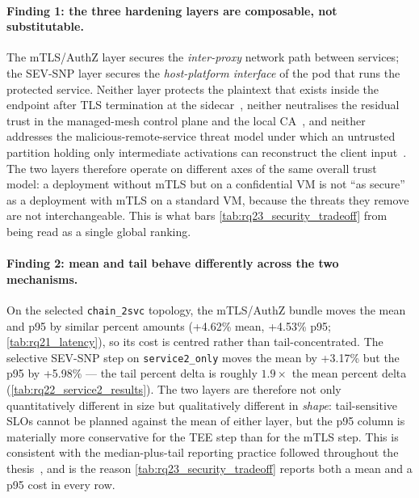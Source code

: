 \paragraph{Finding 1: the three hardening layers are composable, not
substitutable.}
The mTLS/AuthZ layer secures the \emph{inter-proxy} network path between
services; the SEV-SNP layer secures the \emph{host-platform interface} of
the pod that runs the protected service. Neither layer protects the
plaintext that exists inside the endpoint after TLS termination at the
sidecar~\cite{meshinsight_socc23}, neither neutralises the residual trust
in the managed-mesh control plane and the local
CA~\cite{poudel2025mazu}, and neither addresses the malicious-remote-service
threat model under which an untrusted partition holding only intermediate
activations can reconstruct the client
input~\cite{he2021_attacking_collaborative}. The two layers therefore
operate on different axes of the same overall trust model: a deployment
without mTLS but on a confidential VM is not ``as secure'' as a deployment
with mTLS on a standard VM, because the threats they remove are not
interchangeable. This is what bars \cref{tab:rq23_security_tradeoff} from
being read as a single global ranking.

\paragraph{Finding 2: mean and tail behave differently across the two
mechanisms.}
On the selected \texttt{chain\_2svc} topology, the mTLS/AuthZ bundle moves
the mean and p95 by similar percent amounts (+4.62\% mean, +4.53\% p95;
\cref{tab:rq21_latency}), so its cost is centred rather than
tail-concentrated. The selective SEV-SNP step on \texttt{service2\_only}
moves the mean by +3.17\% but the p95 by +5.98\% --- the tail percent
delta is roughly $1.9 \times$ the mean percent delta
(\cref{tab:rq22_service2_results}). The two layers are therefore not only
quantitatively different in size but qualitatively different in
\emph{shape}: tail-sensitive SLOs cannot be planned against the mean of
either layer, but the p95 column is materially more conservative for the
TEE step than for the mTLS step. This is consistent with the
median-plus-tail reporting practice followed throughout the
thesis~\cite{benchmarking_sc15}, and is the reason
\cref{tab:rq23_security_tradeoff} reports both a mean and a p95 cost in
every row.

